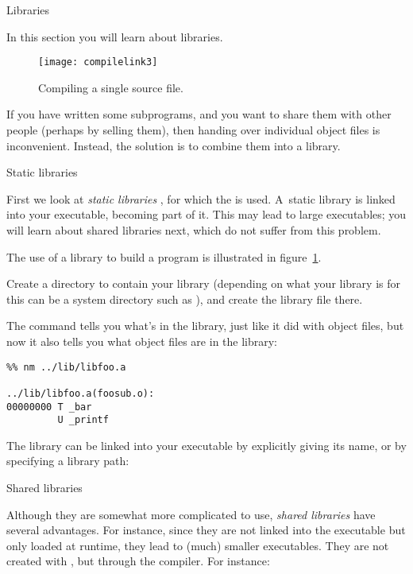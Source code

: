  {Libraries}

\begin{purpose}
  In this section you will learn about libraries.
\end{purpose}

\begin{figure}[ht]
  \texttt{[image: compilelink3]}
  \caption{Compiling a single source file.}
  \label{fig:compilelink3}
\end{figure}

If you have written some subprograms, and you want to share them with
other people (perhaps by selling them), then handing over individual
object files is inconvenient. Instead, the solution is to combine them
into a library.

 {Static libraries}

First we look at
\emph{static libraries}%
,
for
which the   is used. A~static library
is linked into your executable, becoming part of it. This may lead to
large executables; you will learn about shared libraries
next, which do not suffer from this problem.

The use of a library to build a program is illustrated
in figure~\ref{fig:compilelink3}.

Create a directory to contain your library (depending on what your
library is for this can be a
system directory such as ), and create the library file
there. 


The  command tells you what's in the library, just
like it did with object files, but now it also tells you what object
files are in the library:
\begin{verbatim}
%% nm ../lib/libfoo.a 

../lib/libfoo.a(foosub.o):
00000000 T _bar
         U _printf
\end{verbatim}

The library can be linked into your executable by explicitly giving
its name, or by specifying a library path:


 {Shared libraries}

Although they are somewhat more complicated to use, 
\emph{shared libraries}%
have several advantages. For
instance, since they are not linked into the executable but only
loaded at runtime, they lead to (much) smaller executables. They are
not created with , but through the compiler. For instance:

